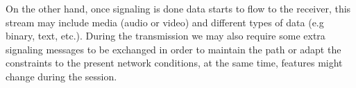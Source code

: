 On the other hand, once signaling is done data starts to flow to the receiver, this stream may include media (audio or video) and different types of data (e.g binary, text, etc.). During the transmission we may also require some extra signaling messages to be exchanged in order to maintain the path or adapt the constraints to the present network conditions, at the same time, features might change during the session. 



